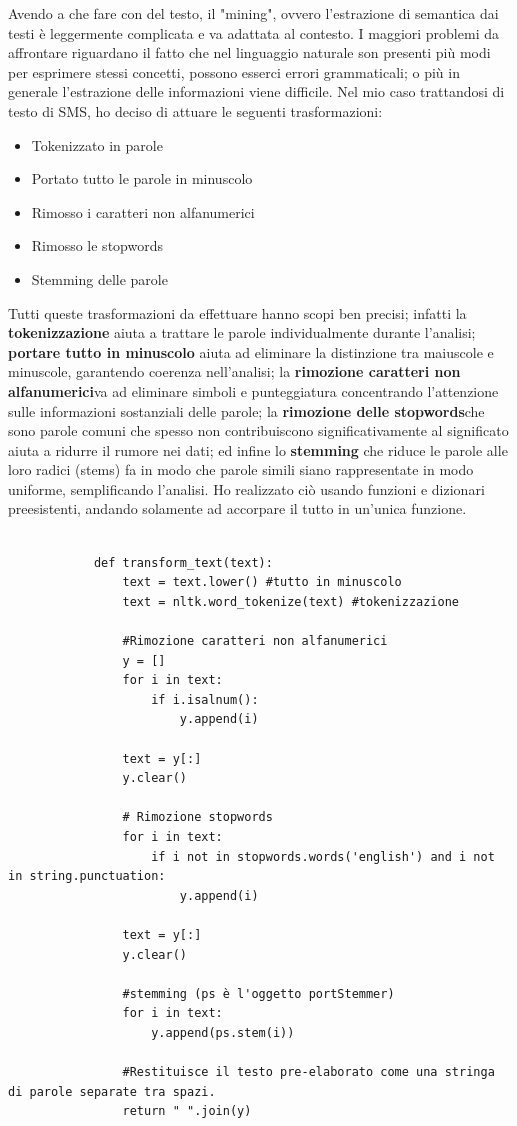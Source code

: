 \documentclass[]{article}
\begin{document}
        Avendo a che fare con del testo, il "mining", ovvero l'estrazione di semantica dai testi è leggermente complicata e va adattata al contesto. I maggiori problemi da affrontare riguardano il fatto che nel linguaggio naturale son presenti più modi per esprimere stessi concetti, possono esserci errori grammaticali; o più in generale l'estrazione delle informazioni viene difficile. Nel mio caso trattandosi di testo di SMS, ho deciso di attuare le seguenti trasformazioni:
        \begin{itemize}
            \item Tokenizzato in parole
            \item Portato tutto le parole in minuscolo
            \item Rimosso i caratteri non alfanumerici
            \item Rimosso le stopwords
            \item Stemming delle parole
        \end{itemize}
        Tutti queste trasformazioni da effettuare hanno scopi ben precisi; infatti la \textbf{tokenizzazione} aiuta a trattare le parole individualmente durante l'analisi;
        \textbf{portare tutto in minuscolo} aiuta ad eliminare la distinzione tra maiuscole e minuscole, garantendo coerenza nell'analisi; la \textbf{rimozione caratteri non alfanumerici}va ad eliminare simboli e punteggiatura concentrando l'attenzione sulle informazioni sostanziali delle parole; la \textbf{rimozione delle stopwords}che sono parole comuni che spesso non contribuiscono significativamente al significato aiuta a ridurre il rumore nei dati; ed infine lo \textbf{stemming} che riduce le parole alle loro radici (stems) fa in modo che parole simili siano rappresentate in modo uniforme, semplificando l'analisi.
        Ho realizzato ciò usando funzioni e dizionari preesistenti, andando solamente ad accorpare il tutto in un'unica funzione.
        \newpage
        \begin{verbatim}

            def transform_text(text):
                text = text.lower() #tutto in minuscolo
                text = nltk.word_tokenize(text) #tokenizzazione

                #Rimozione caratteri non alfanumerici
                y = []
                for i in text:
                    if i.isalnum():
                        y.append(i)

                text = y[:]
                y.clear()

                # Rimozione stopwords
                for i in text:
                    if i not in stopwords.words('english') and i not in string.punctuation:
                        y.append(i)

                text = y[:]
                y.clear()

                #stemming (ps è l'oggetto portStemmer)
                for i in text:
                    y.append(ps.stem(i))

                #Restituisce il testo pre-elaborato come una stringa di parole separate tra spazi.
                return " ".join(y)

        \end{verbatim}
\end{document}
